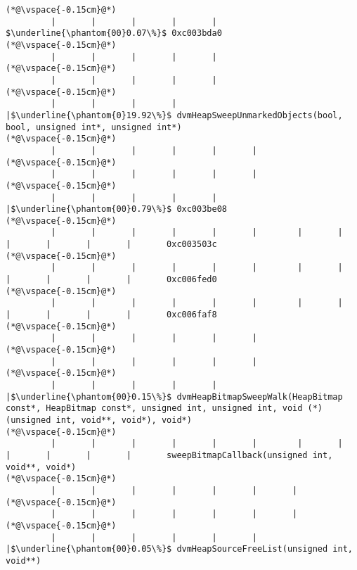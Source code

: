 \begin{lstlisting}[caption=NewDirectByteBuffer, label=profile:C2JNewDirectBuffer-512, numberbychapter=true, frame=lines, float, floatplacement=t]
(*@\vspace{-0.15cm}@*)
         |       |       |       |       |        $\underline{\phantom{00}0.07\%}$ 0xc003bda0
(*@\vspace{-0.15cm}@*)
         |       |       |       |       |
(*@\vspace{-0.15cm}@*)
         |       |       |       |       |
(*@\vspace{-0.15cm}@*)
         |       |       |       |       |$\underline{\phantom{0}19.92\%}$ dvmHeapSweepUnmarkedObjects(bool, bool, unsigned int*, unsigned int*)
(*@\vspace{-0.15cm}@*)
         |       |       |       |       |       |
(*@\vspace{-0.15cm}@*)
         |       |       |       |       |       |
(*@\vspace{-0.15cm}@*)
         |       |       |       |       |       |$\underline{\phantom{00}0.79\%}$ 0xc003be08
(*@\vspace{-0.15cm}@*)
         |       |       |       |       |       |        |       |       |       |       |       |       0xc003503c
(*@\vspace{-0.15cm}@*)
         |       |       |       |       |       |        |       |       |       |       |       |       0xc006fed0
(*@\vspace{-0.15cm}@*)
         |       |       |       |       |       |        |       |       |       |       |       |       0xc006faf8
(*@\vspace{-0.15cm}@*)
         |       |       |       |       |       |
(*@\vspace{-0.15cm}@*)
         |       |       |       |       |       |
(*@\vspace{-0.15cm}@*)
         |       |       |       |       |       |$\underline{\phantom{00}0.15\%}$ dvmHeapBitmapSweepWalk(HeapBitmap const*, HeapBitmap const*, unsigned int, unsigned int, void (*)(unsigned int, void**, void*), void*)
(*@\vspace{-0.15cm}@*)
         |       |       |       |       |       |        |       |       |       |       |       |       sweepBitmapCallback(unsigned int, void**, void*)
(*@\vspace{-0.15cm}@*)
         |       |       |       |       |       |       |
(*@\vspace{-0.15cm}@*)
         |       |       |       |       |       |       |
(*@\vspace{-0.15cm}@*)
         |       |       |       |       |       |       |$\underline{\phantom{00}0.05\%}$ dvmHeapSourceFreeList(unsigned int, void**)

\end{lstlisting}
